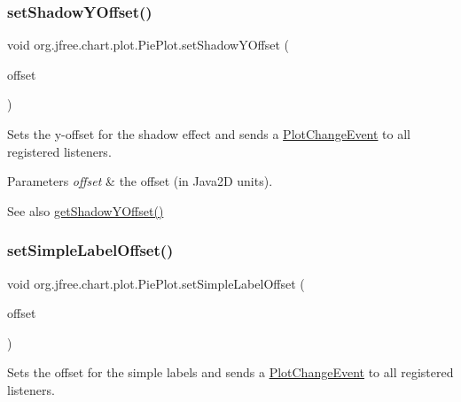 \subsubsection{\texorpdfstring{set\+Shadow\+Y\+Offset()}{setShadowYOffset()}}
{\footnotesize\ttfamily void org.\+jfree.\+chart.\+plot.\+Pie\+Plot.\+set\+Shadow\+Y\+Offset (\begin{DoxyParamCaption}\item[{double}]{offset }\end{DoxyParamCaption})}

Sets the y-\/offset for the shadow effect and sends a \mbox{\hyperlink{}{Plot\+Change\+Event}} to all registered listeners.


\begin{DoxyParams}{Parameters}
{\em offset} & the offset (in Java2D units).\\
\hline
\end{DoxyParams}
\begin{DoxySeeAlso}{See also}
\mbox{\hyperlink{classorg_1_1jfree_1_1chart_1_1plot_1_1_pie_plot_aa8ce8f748fd74382996feb0b02fa7bce}{get\+Shadow\+Y\+Offset()}} 
\end{DoxySeeAlso}
\mbox{\label{classorg_1_1jfree_1_1chart_1_1plot_1_1_pie_plot_af6b12983770243188338750c9858183d}} 
\subsubsection{\texorpdfstring{set\+Simple\+Label\+Offset()}{setSimpleLabelOffset()}}
{\footnotesize\ttfamily void org.\+jfree.\+chart.\+plot.\+Pie\+Plot.\+set\+Simple\+Label\+Offset (\begin{DoxyParamCaption}\item[{Rectangle\+Insets}]{offset }\end{DoxyParamCaption})}

Sets the offset for the simple labels and sends a \mbox{\hyperlink{}{Plot\+Change\+Event}} to all registered listeners.


